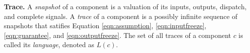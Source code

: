 

{\bf Trace.}
A \emph{snapshot} of a component is a valuation of its inputs, outputs, dispatch, and complete signals. %
A \emph{trace} of a component is a possibly infinite sequence of snapshots %
that satifies Equation \ref{eqn:assumption},  \ref{eqn:inputfreeze}, \ref{eqn:guarantee}, and \ref{eqn:outputfreeze}. %
The set of all traces of a component $c$ is called its \emph{language}, denoted as $L(c)$.



